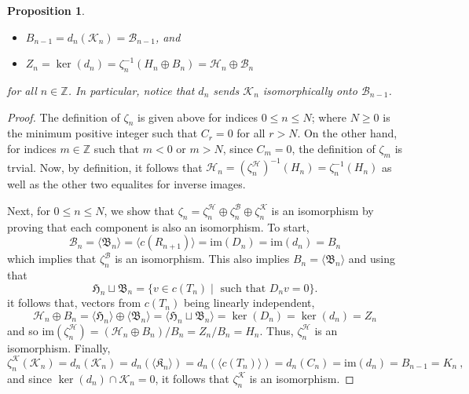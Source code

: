 \documentclass[11pt, table, nothms]{amsart}
\newtheorem{proposition}[theorem]{Proposition}
\theoremstyle{definition}
\newcommand{\B}{\mathcal{B}}
\newcommand{\Z}{\mathbb{Z}}
\newcommand{\cK}{\mathcal{K}}
\newcommand{\cH}{\mathcal{H}}
\newcommand{\fB}{\mathfrak{B}}
\newcommand{\fH}{\mathfrak{H}}
\newcommand{\fK}{\mathfrak{K}}
\newcommand{\ima}{\mathrm{im}}
\begin{document}
{\begin{proposition}
\begin{itemize}
    \item $B_{n-1} = d_n(\cK_{n}) = \B_{n-1}$, and 
    \item $Z_n = \ker(d_n) =  \zeta^{-1}_n(H_n \oplus B_n) = \cH_n \oplus \B_n$
\end{itemize}
for all $n\in \Z$. 
In particular, notice that $d_n$ sends $\cK_n$ isomorphically onto $\B_{n-1}$.
\end{proposition}
\begin{proof}
The definition of $\zeta_n$ is given above for indices $0\leq n \leq N$; where $N\geq 0$ is the minimum positive integer such that $C_r=0$ for all $r>N$.
On the other hand, for indices $m \in \Z$ such that $m < 0$ or $m>N$, since $C_m=0$, the definition of $\zeta_m$ is trvial.
Now, by definition, it follows that $\cH_n=(\zeta^\cH_n)^{-1}(H_n)=\zeta_n^{-1}(H_n)$ as well as the other two equalites for inverse images. 

Next, for $0\leq n \leq N$, we show that  $\zeta_n=\zeta^\cH_n\oplus \zeta^\B_n\oplus \zeta^\cK_n$ is an isomorphism by proving that each component is also an isomorphism.
To start,  
\[
\B_n = \langle \fB_n\rangle = \langle c(R_{n+1})\rangle = \ima (D_n) = \ima(d_n) = B_n
\]
which implies that $\zeta^\B_n$ is an isomorphism. 
This also implies $B_n = \langle \fB_n\rangle$ and using that 
\[
\fH_n \sqcup \fB_n =\{ v \in c(T_n) \mid \mbox{ such that } D_nv=0\}.
\]
it follows that, vectors from $c(T_n)$ being linearly independent,
\[
\cH_n \oplus B_n = \langle\fH_n\rangle \oplus \langle \fB_n\rangle = 
\langle\fH_n \sqcup \fB_n\rangle = 
\ker(D_n)=\ker(d_n)=Z_n
\]
and so
$
\ima(\zeta^\cH_n)= (\cH_n \oplus B_n)/B_n = Z_n/B_n=H_n
$.
Thus, $\zeta^\cH_n$ is an isomorphism.
Finally, 
\[
\zeta^\cK_n(\cK_n)=d_n(\cK_n) = d_n(\langle\fK_n \rangle) = d_n(\langle c(T_n)\rangle) = d_n(C_n) = \ima(d_n)=B_{n-1}=K_n\ ,
\]
and since $\ker(d_n)\cap \cK_n=0$, it follows that $\zeta^\cK_n$ is an isomorphism.


\end{proof}}
\end{document}
